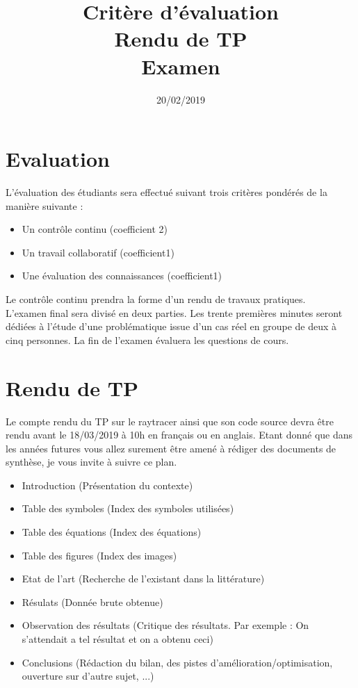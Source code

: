 \documentclass[french,12pt]{article}
\begin{document}
\title{Critère d'évaluation\\Rendu de TP\\Examen}
\date{20/02/2019}
\maketitle

\section{Evaluation}
L'évaluation des étudiants sera effectué suivant trois critères pondérés de la manière suivante :

\begin{itemize}
	\item Un contrôle continu (coefficient 2)
	\item Un travail collaboratif (coefficient1)
	\item Une évaluation des connaissances (coefficient1)
\end{itemize}

Le contrôle continu prendra la forme d'un rendu de travaux pratiques.\\
L'examen final sera divisé en deux parties. Les trente premières minutes seront dédiées à l'étude d'une problématique issue d'un cas réel en groupe de deux à cinq personnes. La fin de l'examen évaluera les questions de cours.

\section{Rendu de TP}
Le compte rendu du TP sur le raytracer ainsi que son code source devra être rendu avant le 18/03/2019 à 10h en français ou en anglais. Etant donné que dans les années futures vous allez surement être amené à rédiger des documents de synthèse, je vous invite à suivre ce plan.

\begin{itemize}
	\item Introduction (Présentation du contexte)
	\item Table des symboles (Index des symboles utilisées)
	\item Table des équations (Index des équations)
	\item Table des figures (Index des images)
	\item Etat de l'art (Recherche de l'existant dans la littérature)
	\item Résulats (Donnée brute obtenue)
	\item Observation des résultats (Critique des résultats. Par exemple : On s'attendait a tel résultat et on a obtenu ceci)
	\item Conclusions (Rédaction du bilan, des pistes d'amélioration/optimisation, ouverture sur d'autre sujet, ...)
\end{itemize}
\end{document}
